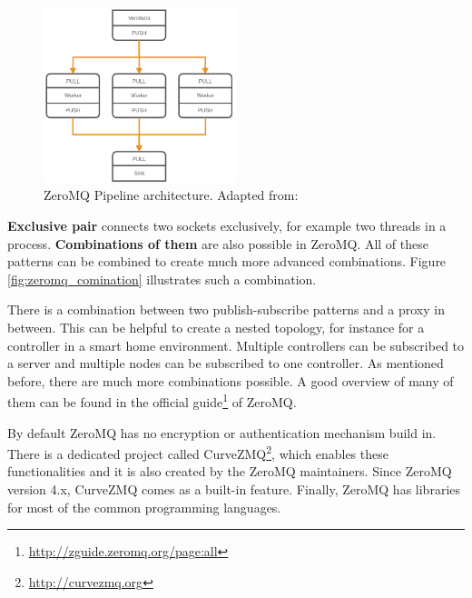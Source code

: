 \begin{figure}[H]
    \centering
    \includegraphics[width=0.5\textwidth]{resources/images/zeromq-vernitlator.png}
    \caption[ZeroMQ Pipeline architecture]{ZeroMQ Pipeline architecture. Adapted from: \autocite{ZeroMQ:Guide}}
    \label{fig:zeromq_pipeline}
\end{figure}

\textbf{Exclusive pair} connects two sockets exclusively, for example two threads in a process.\autocite{ZeroMQ:Guide}
\newline
\textbf{Combinations of them} are also possible in ZeroMQ.
All of these patterns can be combined to create much more advanced combinations.
Figure \ref{fig:zeromq_comination} illustrates such a combination.\newline

There is a combination between two publish-subscribe patterns and a proxy in between.
This can be helpful to create a nested topology, for instance for a controller in a smart home environment.
Multiple controllers can be subscribed to a server and multiple nodes can be subscribed to one controller.
As mentioned before, there are much more combinations possible.
A good overview of many of them can be found in the official guide\footnote{\url{http://zguide.zeromq.org/page:all}} of ZeroMQ.\newline

By default ZeroMQ has no encryption or authentication mechanism build in.
There is a dedicated project called CurveZMQ\footnote{\url{http://curvezmq.org}}, which enables these functionalities and it is also created by the ZeroMQ maintainers.
Since ZeroMQ version 4.x, CurveZMQ comes as a built-in feature.
Finally, ZeroMQ has libraries for most of the common programming languages.\newline

